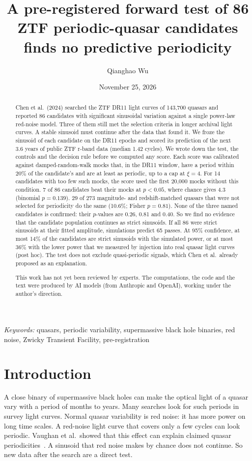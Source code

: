 \documentclass[11pt]{article}
\title{A pre-registered forward test of 86 ZTF periodic-quasar candidates finds no predictive periodicity}
\author{Qianghao Wu}
\date{November 25, 2026}
\begin{document}
\maketitle
\begin{abstract}
Chen et al.\ (2024) searched the ZTF DR11 light curves of 143,700 quasars and reported 86 candidates with significant sinusoidal variation against a single power-law red-noise model. Three of them still met the selection criteria in longer archival light curves. A stable sinusoid must continue after the data that found it. We froze the sinusoid of each candidate on the DR11 epochs and scored its prediction of the next 3.6 years of public ZTF r-band data (median 1.42 cycles). We wrote down the test, the controls and the decision rule before we computed any score. Each score was calibrated against damped-random-walk mocks that, in the DR11 window, have a period within 20\% of the candidate's and are at least as periodic, up to a cap at $\xi=4$. For 14 candidates with too few such mocks, the score used the first 20,000 mocks without this condition. 7 of 86 candidates beat their mocks at $p<0.05$, where chance gives 4.3 (binomial $p=0.139$). 29 of 273 magnitude- and redshift-matched quasars that were not selected for periodicity do the same (10.6\%; Fisher $p=0.81$). None of the three named candidates is confirmed: their $p$-values are 0.26, 0.81 and 0.40. So we find no evidence that the candidate population continues as strict sinusoids. If all 86 were strict sinusoids at their fitted amplitude, simulations predict 65 passes. At 95\% confidence, at most 14\% of the candidates are strict sinusoids with the simulated power, or at most 36\% with the lower power that we measured by injection into real quasar light curves (post hoc). The test does not exclude quasi-periodic signals, which Chen et al.\ already proposed as an explanation.

This work has not yet been reviewed by experts. The computations, the code and the text were produced by AI models (from Anthropic and OpenAI), working under the author's direction.
\end{abstract}
\medskip
\noindent\textit{Keywords:} quasars, periodic variability, supermassive black hole binaries, red noise, Zwicky Transient Facility, pre-registration

\section{Introduction}
A close binary of supermassive black holes can make the optical light of a quasar vary with a period of months to years. Many searches look for such periods in survey light curves. Normal quasar variability is red noise: it has more power on long time scales. A red-noise light curve that covers only a few cycles can look periodic. Vaughan et al.\ showed that this effect can explain claimed quasar periodicities~\cite{vaughan2016}. A sinusoid that red noise makes by chance does not continue. So new data after the search are a direct test.
\end{document}
